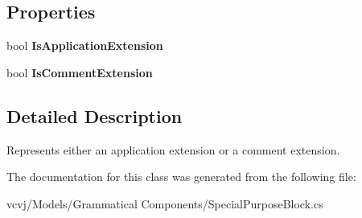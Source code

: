 \subsection*{Properties}
\begin{DoxyCompactItemize}
\item 
bool {\bfseries Is\+Application\+Extension}\hypertarget{classvcvj_1_1_models_1_1_grammatical___components_1_1_special_purpose_block_a1067a5a9f73f041525fb145c80560b1e}{}\label{classvcvj_1_1_models_1_1_grammatical___components_1_1_special_purpose_block_a1067a5a9f73f041525fb145c80560b1e}

\item 
bool {\bfseries Is\+Comment\+Extension}\hypertarget{classvcvj_1_1_models_1_1_grammatical___components_1_1_special_purpose_block_a534070d3a8fe216b7f2c7fbb037c1ed3}{}\label{classvcvj_1_1_models_1_1_grammatical___components_1_1_special_purpose_block_a534070d3a8fe216b7f2c7fbb037c1ed3}

\end{DoxyCompactItemize}


\subsection{Detailed Description}
Represents either an application extension or a comment extension. 



The documentation for this class was generated from the following file\+:\begin{DoxyCompactItemize}
\item 
vcvj/\+Models/\+Grammatical Components/Special\+Purpose\+Block.\+cs\end{DoxyCompactItemize}
